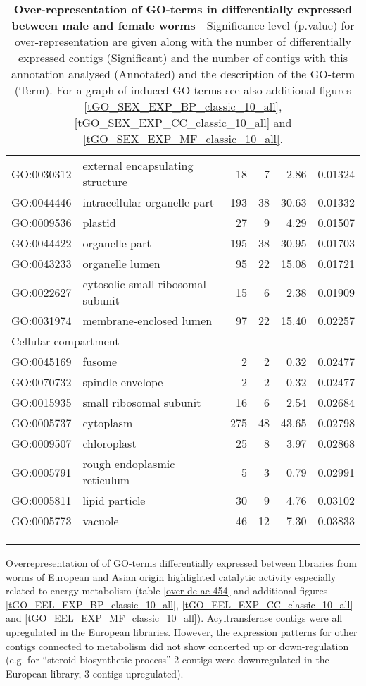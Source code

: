 \begin{longtable}{lp{4.5cm}rrrl}
  GO:0030312 & external encapsulating structure &  18 &   7 & 2.86 & 0.01324 \\ 
  GO:0044446 & intracellular organelle part & 193 &  38 & 30.63 & 0.01332 \\ 
  GO:0009536 & plastid &  27 &   9 & 4.29 & 0.01507 \\ 
  GO:0044422 & organelle part & 195 &  38 & 30.95 & 0.01703 \\ 
  GO:0043233 & organelle lumen &  95 &  22 & 15.08 & 0.01721 \\ 
  GO:0022627 & cytosolic small ribosomal subunit &  15 &   6 & 2.38 & 0.01909 \\ 
  GO:0031974 & membrane-enclosed lumen &  97 &  22 & 15.40 & 0.02257 \\ 
   \hline
   \multicolumn{6}{l}{Cellular compartment}  \\ 
GO:0045169 & fusome &   2 &   2 & 0.32 & 0.02477 \\ 
  GO:0070732 & spindle envelope &   2 &   2 & 0.32 & 0.02477 \\ 
  GO:0015935 & small ribosomal subunit &  16 &   6 & 2.54 & 0.02684 \\ 
  GO:0005737 & cytoplasm & 275 &  48 & 43.65 & 0.02798 \\ 
  GO:0009507 & chloroplast &  25 &   8 & 3.97 & 0.02868 \\ 
  GO:0005791 & rough endoplasmic reticulum &   5 &   3 & 0.79 & 0.02991 \\ 
  GO:0005811 & lipid particle &  30 &   9 & 4.76 & 0.03102 \\ 
  GO:0005773 & vacuole &  46 &  12 & 7.30 & 0.03833 \\ 
\hline\\
\caption[Over-representation of GO-terms in positively
selected]{\textbf{Over-representation of GO-terms in differentially
    expressed between male and female worms} - Significance level
  (p.value) for over-representation are given along with the number of
  differentially expressed contigs (Significant) and the number of
  contigs with this annotation analysed (Annotated) and the
  description of the GO-term (Term). For a graph of induced GO-terms
  see also additional figures \ref{tGO_SEX_EXP_BP_classic_10_all},
  \ref{tGO_SEX_EXP_CC_classic_10_all} and
  \ref{tGO_SEX_EXP_MF_classic_10_all}.}\\
\label{over-de-mf-454}
\end{longtable}


Overrepresentation of of GO-terms differentially expressed between
libraries from worms of European and Asian origin highlighted catalytic
activity especially related to energy metabolism
(table \ref{over-de-ae-454} and additional figures
\ref{tGO_EEL_EXP_BP_classic_10_all},
\ref{tGO_EEL_EXP_CC_classic_10_all} and
\ref{tGO_EEL_EXP_MF_classic_10_all}).  Acyltransferase contigs were
all upregulated in the European libraries. However, the expression
patterns for other contigs connected to metabolism did not show
concerted up or down-regulation (e.g. for ``steroid biosynthetic
process'' 2 contigs were downregulated in the European library, 3
contigs upregulated).



